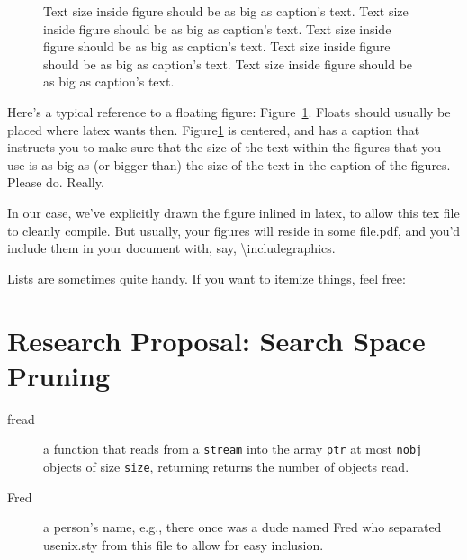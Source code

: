 \begin{figure}
\begin{center}
\end{center}
\caption{\label{fig:vectors} Text size inside figure should be as big as
  caption's text. Text size inside figure should be as big as
  caption's text. Text size inside figure should be as big as
  caption's text. Text size inside figure should be as big as
  caption's text. Text size inside figure should be as big as
  caption's text. }
\end{figure}


Here's a typical reference to a floating figure:
Figure~\ref{fig:vectors}. Floats should usually be placed where latex
wants then. Figure\ref{fig:vectors} is centered, and has a caption
that instructs you to make sure that the size of the text within the
figures that you use is as big as (or bigger than) the size of the
text in the caption of the figures. Please do. Really.

In our case, we've explicitly drawn the figure inlined in latex, to
allow this tex file to cleanly compile. But usually, your figures will
reside in some file.pdf, and you'd include them in your document
with, say, \textbackslash{}includegraphics.

Lists are sometimes quite handy. If you want to itemize things, feel
free:

\section{Research Proposal: Search Space Pruning}

\begin{description}
  
\item[fread] a function that reads from a \texttt{stream} into the
  array \texttt{ptr} at most \texttt{nobj} objects of size
  \texttt{size}, returning returns the number of objects read.

\item[Fred] a person's name, e.g., there once was a dude named Fred
  who separated usenix.sty from this file to allow for easy
  inclusion.
\end{description}

